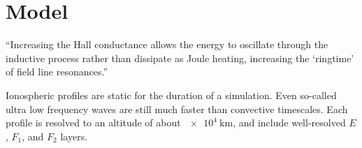 
\chapter{Model}
  \label{ch_model}








``Increasing the Hall conductance allows the energy to oscillate through the inductive process rather than dissipate as Joule heating, increasing the `ringtime' of field line resonances.''\cite{waters_2013}



Ionospheric profiles are static for the duration of a simulation. Even so-called ultra low frequency waves are still much faster than convective timescales. Each profile is resolved to an altitude of about $\SI{e4}{\km}$, and include well-resolved $E$, $F_1$, and $F_2$ layers. 

